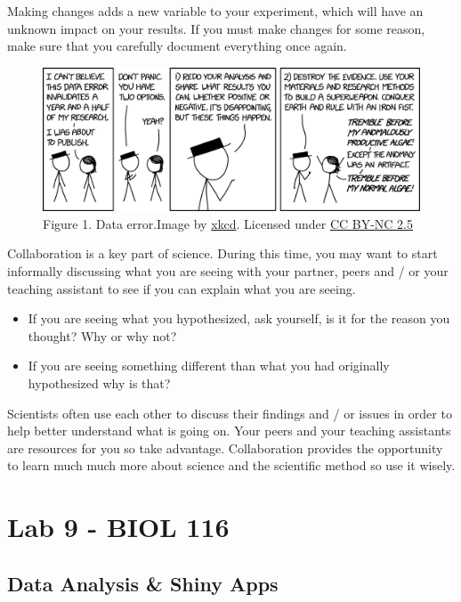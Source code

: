 \documentclass[
]{book}
\providecommand{\tightlist}{%
  \setlength{\itemsep}{0pt}\setlength{\parskip}{0pt}}
\begin{document}
Making changes adds a new variable to your experiment, which will have an unknown impact on your results. If you must make changes for some reason, make sure that you carefully document everything once again.

\begin{figure}
\centering
\includegraphics{figures_images/Lab8-Fig1.png}
\caption{Figure 1. Data error.Image by \href{https://xkcd.com/2239/}{xkcd}. Licensed under \href{https://creativecommons.org/licenses/by-nc/2.5/}{CC BY-NC 2.5}}
\end{figure}

Collaboration is a key part of science. During this time, you may want to start informally discussing what you are seeing with your partner, peers and / or your teaching assistant to see if you can explain what you are seeing.

\begin{itemize}
\tightlist
\item
  If you are seeing what you hypothesized, ask yourself, is it for the reason you thought? Why or why not?
\item
  If you are seeing something different than what you had originally hypothesized why is that?
\end{itemize}

Scientists often use each other to discuss their findings and / or issues in order to help better understand what is going on. Your peers and your teaching assistants are resources for you so take advantage. Collaboration provides the opportunity to learn much much more about science and the scientific method so use it wisely.

\hypertarget{part-lab-9---biol-116}{%
\part*{Lab 9 - BIOL 116}\label{part-lab-9---biol-116}}

\hypertarget{data-analysis-shiny-apps}{%
\chapter*{Data Analysis \& Shiny Apps}\label{data-analysis-shiny-apps}}
\end{document}
